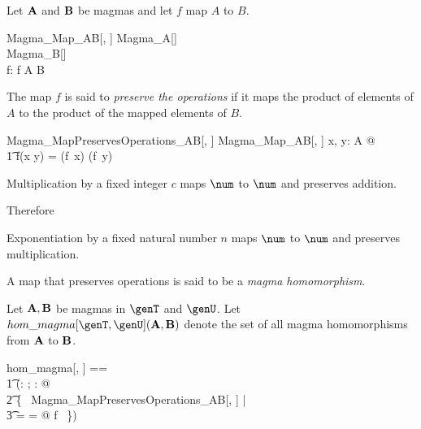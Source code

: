 \documentclass{amsart}
\begin{document}
Let $\mathbf{A}$ and $\mathbf{B}$ be magmas and let $f$ map $A$ to $B$.
\begin{schema}{Magma\_Map\_AB}[\genT, \genU]
	Magma\_A[\genT] \\
	Magma\_B[\genU] \\
	f: \genT \pfun \genU
\where
	f \in A \fun B
\end{schema}

The map $f$ is said to {\em preserve the operations} if it maps the product of elements of $A$ to 
the product of the mapped elements of $B$.
\begin{schema}{Magma\_MapPreservesOperations\_AB}[\genT, \genU]
	Magma\_Map\_AB[\genT, \genU]
\where
	\forall x, y: A @ \\
	\t1	f(x \mulA y) = (f~x) \mulB (f~y)
\end{schema}

\begin{example}
Multiplication by a fixed integer $c$ maps $\num$ to $\num$ and preserves addition.

Therefore
\end{example}

\begin{example}
Exponentiation by a fixed natural number $n$ maps $\num$ to $\num$ and preserves multiplication.
\end{example}

A map that preserves operations is said to be a \textit{magma homomorphism}.

Let $\mathbf{A}, \mathbf{B}$ be magmas in $\genT$ and $\genU$. 
Let $hom\_magma[\genT, \genU](\strucA, \strucB)$ denote the set of all magma homomorphisms from $\mathbf{A}$ to $\mathbf{B}$.

\begin{zed}
	hom\_magma[\genT, \genU] == \\
	\t1	(\lambda \alpha: \magma \genT; \beta: \magma \genU @ \\
	\t2		\{~ Magma\_MapPreservesOperations\_AB[\genT, \genU] | \\
	\t3			\alpha = \strucA \land \beta = \strucB @ f ~\})
\end{zed}
\end{document}
